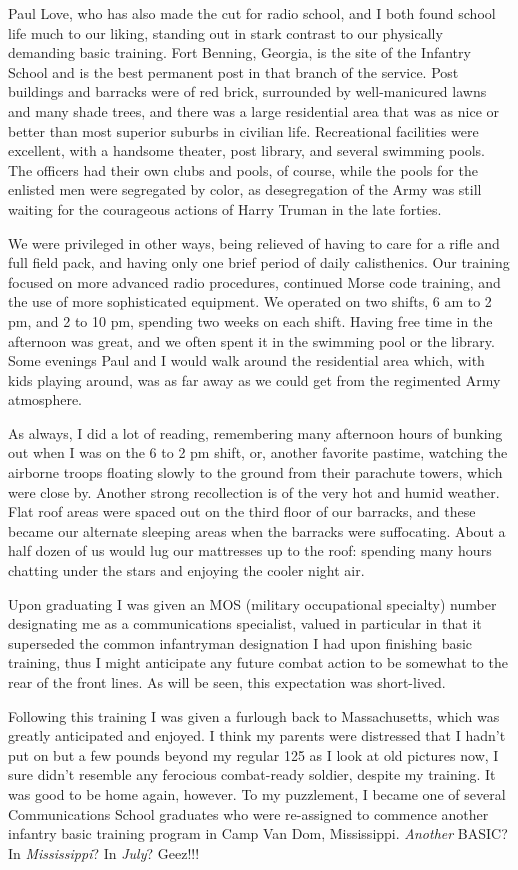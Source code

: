\documentclass[../m3y]{subfiles}
\begin{document}
Paul Love, who has also made the cut for radio school, and I both found school life much to our liking, standing out in stark contrast to our physically demanding basic training. Fort Benning, Georgia, is the site of the Infantry School and is the best permanent post in that branch of the service. Post buildings and barracks were of red brick, surrounded by well-manicured lawns and many shade trees, and there was a large residential area that was as nice or better than most superior suburbs in civilian life. Recreational facilities were excellent, with a handsome theater, post library, and several swimming pools. The officers had their own clubs and pools, of course, while the pools for the enlisted men were segregated by color, as desegregation of the Army was still waiting for the courageous actions of Harry Truman in the late forties.

We were privileged in other ways, being relieved of having to care for a rifle and full field pack, and having only one brief period of daily calisthenics. Our training focused on more advanced radio procedures, continued Morse code training, and the use of more sophisticated equipment. We operated on two shifts, 6 am to 2 pm, and 2 to 10 pm, spending two weeks on each shift. Having free time in the afternoon was great, and we often spent it in the swimming pool or the library. Some evenings Paul and I would walk around the residential area which, with kids playing around, was as far away as we could get from the regimented Army atmosphere.

As always, I did a lot of reading, remembering many afternoon hours of bunking out when I was on the 6 to 2 pm shift, or, another favorite pastime, watching the airborne troops floating slowly to the ground from their parachute towers, which were close by. Another strong recollection is of the very hot and humid weather. Flat roof areas were spaced out on the third floor of our barracks, and these became our alternate sleeping areas when the barracks were suffocating. About a half dozen of us would lug our mattresses up to the roof: spending many hours chatting under the stars and enjoying the cooler night air.

Upon graduating I was given an MOS (military occupational specialty) number designating me as a communications specialist, valued in particular in that it superseded the common infantryman designation I had upon finishing basic training, thus I might anticipate any future combat action to be somewhat to the rear of the front lines. As will be seen, this expectation was short-lived.

Following this training I was given a furlough back to Massachusetts, which was greatly anticipated and enjoyed. I think my parents were distressed that I hadn't put on but a few pounds beyond my regular 125 as I look at old pictures now, I sure didn't resemble any ferocious combat-ready soldier, despite my training. It was good to be home again, however. To my puzzlement, I became one of several Communications School graduates who were re-assigned to commence another infantry basic training program in Camp Van Dom, Mississippi. \emph{Another} BASIC? In \emph{Mississippi}? In \emph{July}? Geez!!!
\end{document}
